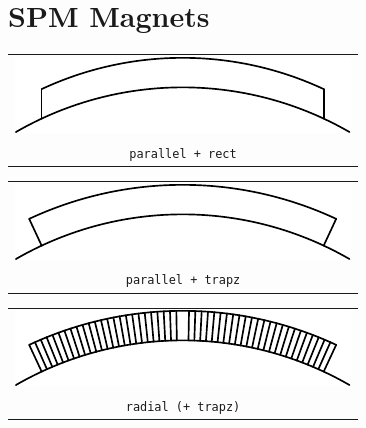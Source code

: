 \documentclass[a4paper,11pt,oneside]{report}
\begin{document}
\newpage
\section{SPM Magnets}

\begin{tabular}{c}
\includegraphics[scale=1]{../examples/magnets/parallel_rect}
\\
\texttt{parallel + rect}
\end{tabular}
\vspace{5mm}

\noindent
\begin{tabular}{c}
\includegraphics[scale=1]{../examples/magnets/parallel_trapz}
\\
\texttt{parallel + trapz}
\end{tabular}
\vspace{5mm}

\noindent
\begin{tabular}{c}
\includegraphics[scale=1]{../examples/magnets/radial_trapz}
\\
\texttt{radial (+ trapz)}
\end{tabular}




\newpage
\end{document}
